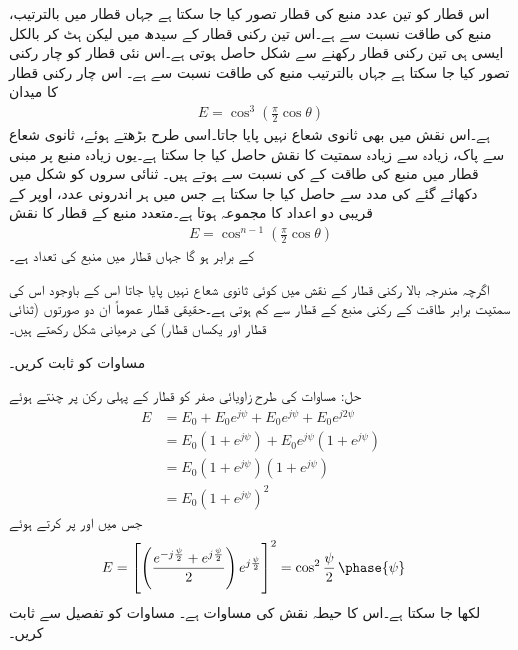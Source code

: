 اس قطار کو تین عدد منبع کی قطار تصور کیا جا سکتا ہے جہاں قطار میں بالترتیب، منبع کی طاقت  نسبت سے ہے۔اس تین رکنی قطار کے سیدھ میں لیکن  ہٹ کر بالکل ایسی ہی تین رکنی قطار رکھنے سے شکل حاصل ہوتی ہے۔اس نئی قطار کو چار رکنی تصور کیا جا سکتا ہے جہاں بالترتیب منبع کی طاقت  نسبت سے ہے۔ اس چار رکنی قطار کا میدان
\begin{align}
E=\cos^3 \left(\frac{\pi}{2}\cos \theta\right)
\end{align}
ہے۔اس نقش میں بھی ثانوی شعاع نہیں پایا جاتا۔اسی طرح بڑھتے ہوئے، ثانوی شعاع سے پاک، زیادہ سے زیادہ سمتیت کا نقش حاصل کیا جا سکتا ہے۔یوں زیادہ منبع پر مبنی قطار میں منبع کی طاقت  کے  کی نسبت سے ہوتے ہیں۔ ثنائی سروں کو شکل میں دکھائے گئے  کی مدد سے حاصل کیا جا سکتا ہے جس میں ہر اندرونی عدد، اوپر کے قریبی دو اعداد کا مجموعہ ہوتا ہے۔متعدد منبع کے قطار کا نقش
\begin{align}\label{مساوات_اینٹینا_ثنائی_قطار_نقش}
E=\cos^{n-1} \left(\frac{\pi}{2}\cos \theta\right)
\end{align}
کے برابر ہو گا جہاں قطار میں منبع کی تعداد  ہے۔

اگرچہ مندرجہ بالا  رکنی  قطار کے نقش میں کوئی ثانوی شعاع نہیں پایا جاتا اس کے باوجود اس کی سمتیت برابر طاقت کے  رکنی منبع کے قطار سے کم ہوتی ہے۔حقیقی قطار عموماً ان دو صورتوں (ثنائی قطار اور یکساں قطار) کی درمیانی شکل رکھتے ہیں۔  

مساوات  کو ثابت کریں۔

حل: مساوات  کی طرح زاویائی صفر کو قطار کے پہلی رکن پر چنتے ہوئے
\begin{align*}
E&=E_0+E_0 e^{j\psi}+ E_0 e^{j\psi}+ E_0 e^{j 2\psi}\\
&=E_0 \left(1+e^{j\psi} \right)+E_0 e^{j\psi}\left(1+e^{j\psi} \right)\\
&=E_0 \left(1+e^{j\psi} \right)\left(1+e^{j\psi} \right)\\
&=E_0 \left(1+e^{j\psi} \right)^2
\end{align*}
جس میں  اور  پر کرتے ہوئے
\begin{align*}
E&=\left[\left(\frac{e^{-j\frac{\psi}{2}}+e^{j \frac{\psi}{2}}}{2}\right)  e^{j\frac{\psi}{2}} \right]^2=\cos^2 \frac{\psi}{2} \, \phase{\psi}
\end{align*}
لکھا جا سکتا ہے۔اس کا حیطہ  نقش کی مساوات ہے۔
مساوات  کو تفصیل سے ثابت کریں۔

